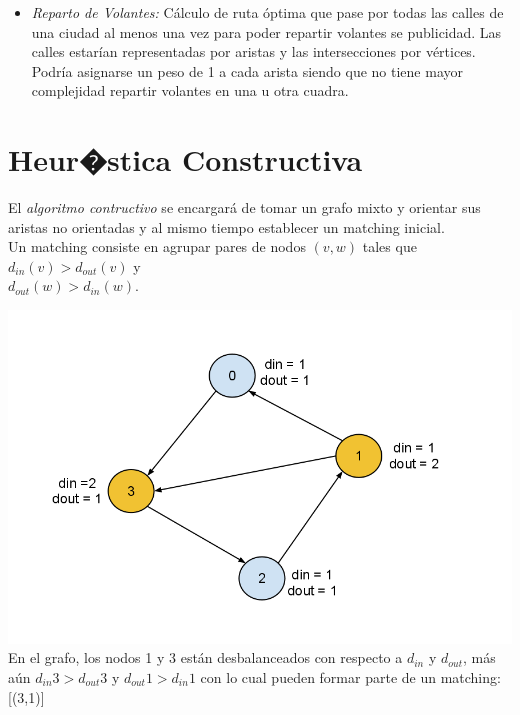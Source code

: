\documentclass[11pt, a4paper, spanish]{article}
\begin{document}
	\begin{itemize}
	\item \emph{Reparto de Volantes:} C\'alculo de ruta \'optima que pase por todas las calles de una ciudad al menos una vez para poder repartir volantes se publicidad. Las calles estar\'ian representadas por aristas y las intersecciones por v\'ertices. Podr\'ia asignarse un peso de 1 a cada arista siendo que no tiene mayor complejidad repartir volantes en una u otra cuadra.
	\end{itemize}

\newpage
\section{Heur�stica Constructiva}

	El \emph{algoritmo contructivo} se encargar\'a de tomar un grafo mixto y orientar sus aristas no orientadas y al mismo tiempo establecer un matching inicial.\\ Un matching consiste en agrupar pares de nodos ${(v,w)}$ tales que $d_{in}(v) > d_{out}(v)$ y\\ $d_{out}(w) > d_{in}(w)$.

\begin{center}
\centering \includegraphics[scale=0.30]{img/Matching.png}\\
\small{En el grafo, los nodos 1 y 3 est\'an desbalanceados con respecto a $d_{in}$ y $d_{out}$, m\'as a\'un $d_{in} 3 > d_{out} 3$ y $d_{out} 1 > d_{in} 1$ con lo cual pueden formar parte de un matching: [(3,1)]}
\end{center}
\end{document}
